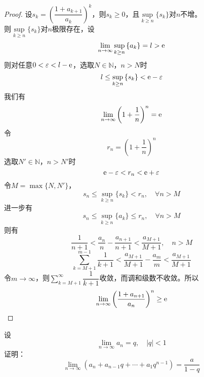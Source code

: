 \begin{proof}

    设$s_k = \left( \dfrac{1 + a_{k + 1}}{a_k} \right)^k$，则$s_k \geq 0$，且$\sup\limits_{k \geq n}\{s_k\}$对$n$不增。\\
    则$\sup\limits_{k \geq n}\{s_k\}$对$n$极限存在，设
    $$\lim\limits_{n \to \infty}{\sup_{k \geq n}{\{a_k\}}} = l > \mathrm{e}$$
    则对任意$0 < \varepsilon < l - \mathrm{e}$，选取$N \in \mathbb{N}$，$n > N$时
    $$l \leq \sup_{k \geq n }{\{s_k\}} < \mathrm{e} - \varepsilon$$
    我们有
    $$\lim\limits_{n \to \infty}{\left( 1 + \dfrac{1}{n} \right)^n} = \mathrm{e}$$
    令
    $$r_n = \left( 1 + \dfrac{1}{n} \right)^n$$
    选取$N' \in \mathbb{N}$，$n > N'$时
    $$\mathrm{e} - \varepsilon < r_n < \mathrm{e} + \varepsilon$$
    令$M = \max\{N, N'\}$，
    $$s_n \leq \sup_{k \geq n}\{s_k\} < r_n, \quad \forall n > M$$
    进一步有
    $$s_n \leq \sup_{k \geq n}\{a_k\} \leq r_n, \quad \forall n > M$$
    则有
    $$\dfrac{1}{n + 1} < \dfrac{a_n}{n} - \dfrac{a_{n + 1}}{n + 1} < \dfrac{a_{M + 1}}{M + 1}, \quad n > M$$
    $$\sum\limits_{k = M + 1}^{m - 1}{\dfrac{1}{k + 1}} < \dfrac{a_{M + 1}}{M + 1} - \dfrac{a_m}{m} < \dfrac{a_{M + 1}}{M + 1}$$
    令$m \to \infty$，则$\sum\limits_{k = M + 1}^{\infty}{\dfrac{1}{k + 1}}$收敛，而调和级数不收敛。所以
    $$\lim\limits_{n \to \infty}{\left( \dfrac{1 + a_{n + 1}}{a_n} \right)^n} \geq \mathrm{e}$$

\end{proof}

\begin{proposition}
    
    设
    $$\lim\limits_{n \to \infty}{a_n} = q, \quad |q| < 1$$
    证明：
    $$\lim\limits_{n \to \infty}{(a_n + a_{n - 1}q + \cdots + a_1q^{n - 1})} = \dfrac{a}{1 - q}$$

\end{proposition}

